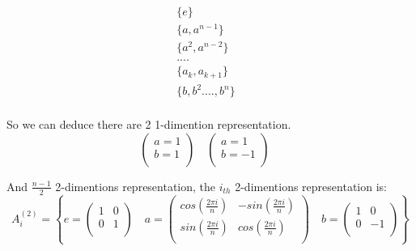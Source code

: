 \documentclass{article}
\begin{document}
\begin{CJK*}{GBK}{song}
\begin{equation}
\begin{aligned}
\{e\}&\\
\{a,a^{n-1}\}&\\
\{a^2,a^{n-2}\}&\\
....\\
\{a_k,a_{k+1}\}&\\
\{b,b^2....,b^{n}\}&\\
\end{aligned}
\end{equation}

So we can deduce there are 2 1-dimention representation.
\begin{equation}
\begin{pmatrix}
     a=1 \\
     b=1 \\
\end{pmatrix}\quad
\begin{pmatrix}
     a=1 \\
     b=-1 \\
\end{pmatrix}\quad
\end{equation}

And $\frac{n-1}{2}$ 2-dimentions representation, the $i_{th}$ 2-dimentions representation is:
\begin{equation}
A_i^{(2)}=\left\{
e=
\begin{pmatrix}
     1  &  0 \\
     0  &  1 \\
\end{pmatrix}\quad
a=
\begin{pmatrix}
     cos(\frac{2\pi i}{n}) & -sin(\frac{2\pi i}{n}) \\
     sin(\frac{2\pi i}{n}) &  cos(\frac{2\pi i}{n}) \\
\end{pmatrix}\quad
b=
\begin{pmatrix}
     1  &  0 \\
     0  & -1 \\
\end{pmatrix}
\right\}
\end{equation}



\end{CJK*}
\end{document}
